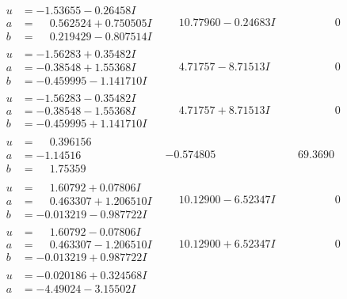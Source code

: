 \documentclass[1p]{elsarticle_modified}
\theoremstyle{definition}
\begin{document}
$$\begin{array}{c|c|c}
 \hline 
\begin{aligned}
u &= -1.53655 - 0.26458 I \\
a &= \phantom{-}0.562524 + 0.750505 I \\
b &= \phantom{-}0.219429 - 0.807514 I\end{aligned}
 & \phantom{-}10.77960 - 0.24683 I & \phantom{-0.000000 } 0 \\ \hline\begin{aligned}
u &= -1.56283 + 0.35482 I \\
a &= -0.38548 + 1.55368 I \\
b &= -0.459995 - 1.141710 I\end{aligned}
 & \phantom{-}4.71757 - 8.71513 I & \phantom{-0.000000 } 0 \\ \hline\begin{aligned}
u &= -1.56283 - 0.35482 I \\
a &= -0.38548 - 1.55368 I \\
b &= -0.459995 + 1.141710 I\end{aligned}
 & \phantom{-}4.71757 + 8.71513 I & \phantom{-0.000000 } 0 \\ \hline\begin{aligned}
u &= \phantom{-}0.396156\phantom{ +0.000000I} \\
a &= -1.14516\phantom{ +0.000000I} \\
b &= \phantom{-}1.75359\phantom{ +0.000000I}\end{aligned}
 & -0.574805\phantom{ +0.000000I} & \phantom{-}69.3690\phantom{ +0.000000I} \\ \hline\begin{aligned}
u &= \phantom{-}1.60792 + 0.07806 I \\
a &= \phantom{-}0.463307 + 1.206510 I \\
b &= -0.013219 - 0.987722 I\end{aligned}
 & \phantom{-}10.12900 - 6.52347 I & \phantom{-0.000000 } 0 \\ \hline\begin{aligned}
u &= \phantom{-}1.60792 - 0.07806 I \\
a &= \phantom{-}0.463307 - 1.206510 I \\
b &= -0.013219 + 0.987722 I\end{aligned}
 & \phantom{-}10.12900 + 6.52347 I & \phantom{-0.000000 } 0 \\ \hline\begin{aligned}
u &= -0.020186 + 0.324568 I \\
a &= -4.49024 - 3.15502 I \\

\end{aligned}
\end{array}$$
\end{document}
